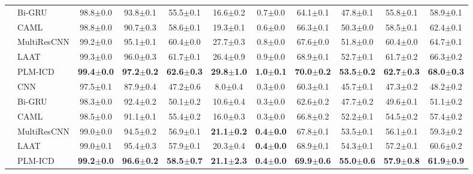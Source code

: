 {\begin{sidewaystable}
{\begin{tabular}{llccccccccc}
        & Bi-GRU  & 98.8$\pm$0.0 & 93.8$\pm$0.1 & 55.5$\pm$0.1 & 16.6$\pm$0.2 & 0.7$\pm$0.0 & 64.1$\pm$0.1 & 47.8$\pm$0.1 & 55.8$\pm$0.1 & 58.9$\pm$0.1 \\
        & CAML & 98.8$\pm$0.0 & 90.7$\pm$0.3 & 58.6$\pm$0.1 & 19.3$\pm$0.1 & 0.6$\pm$0.0 & 66.3$\pm$0.1 & 50.3$\pm$0.0 & 58.5$\pm$0.1 & 62.4$\pm$0.1 \\
        & MultiResCNN  & 99.2$\pm$0.0 & 95.1$\pm$0.1 & 60.4$\pm$0.0 & 27.7$\pm$0.3 & 0.8$\pm$0.0 & 67.6$\pm$0.0 & 51.8$\pm$0.0 & 60.4$\pm$0.0 & 64.7$\pm$0.1 \\
        & LAAT  & 99.3$\pm$0.0 & 96.0$\pm$0.3 & 61.7$\pm$0.1 & 26.4$\pm$0.9 & 0.9$\pm$0.0 & 68.9$\pm$0.1 & 52.7$\pm$0.1 & 61.7$\pm$0.2 & 66.3$\pm$0.2 \\
        & PLM-ICD  & \bfseries 99.4$\pm$0.0 & \bfseries 97.2$\pm$0.2 & \bfseries 62.6$\pm$0.3 & \bfseries 29.8$\pm$1.0 & \bfseries 1.0$\pm$0.1 & \bfseries 70.0$\pm$0.2 & \bfseries 53.5$\pm$0.2 & \bfseries 62.7$\pm$0.3 & \bfseries 68.0$\pm$0.3 \\
        \hline
         & CNN & 97.5$\pm$0.1 & 87.9$\pm$0.4 & 47.2$\pm$0.6 & 8.0$\pm$0.4 & 0.3$\pm$0.0 & 60.3$\pm$0.1 & 45.7$\pm$0.1 & 47.3$\pm$0.2 & 48.2$\pm$0.2 \\
        & Bi-GRU  & 98.3$\pm$0.0 & 92.4$\pm$0.2 & 50.1$\pm$0.2 & 10.6$\pm$0.4 & 0.3$\pm$0.0 & 62.6$\pm$0.2 & 47.7$\pm$0.2 & 49.6$\pm$0.1 & 51.1$\pm$0.2 \\
        & CAML  & 98.5$\pm$0.0 & 91.1$\pm$0.1 & 55.4$\pm$0.2 & 16.0$\pm$0.3 & 0.3$\pm$0.0 & 66.8$\pm$0.2 & 52.2$\pm$0.1 & 54.5$\pm$0.2 & 57.4$\pm$0.2 \\
        & MultiResCNN  & 99.0$\pm$0.0 & 94.5$\pm$0.2 & 56.9$\pm$0.1 & \bfseries 21.1$\pm$0.2 & \bfseries 0.4$\pm$0.0 & 67.8$\pm$0.1 & 53.5$\pm$0.1 & 56.1$\pm$0.1 & 59.3$\pm$0.2 \\
        & LAAT  & 99.0$\pm$0.1 & 95.4$\pm$0.3 & 57.9$\pm$0.1 & 20.3$\pm$0.4 & \bfseries 0.4$\pm$0.0 & 68.9$\pm$0.1 & 54.3$\pm$0.1 & 57.2$\pm$0.1 & 60.6$\pm$0.2 \\
        & PLM-ICD   & \bfseries 99.2$\pm$0.0 & \bfseries 96.6$\pm$0.2 & \bfseries 58.5$\pm$0.7 & \bfseries 21.1$\pm$2.3 & \bfseries 0.4$\pm$0.0 & \bfseries 69.9$\pm$0.6 & \bfseries 55.0$\pm$0.6 & \bfseries 57.9$\pm$0.8 & \bfseries 61.9$\pm$0.9 \\
        
        \bottomrule
    \end{tabular}%
    }
\end{sidewaystable}

}
